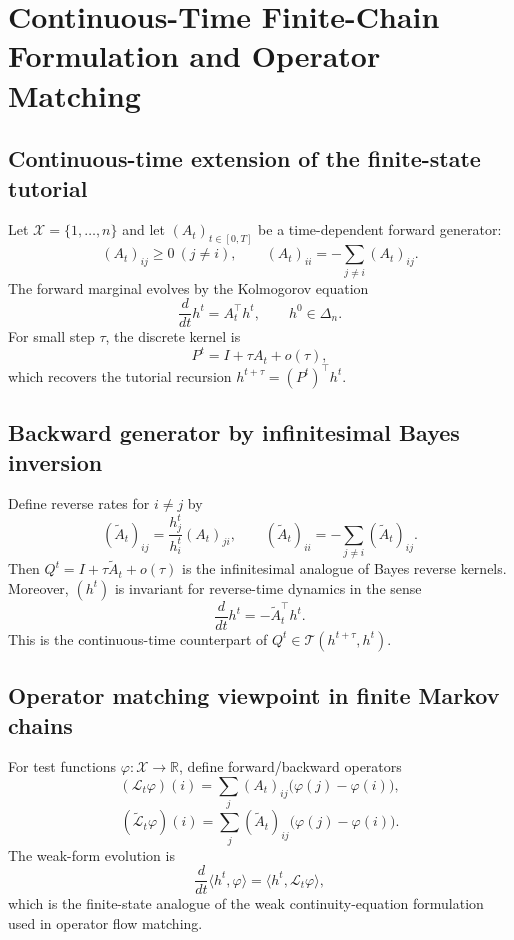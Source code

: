 \documentclass[11pt]{article}
\newcommand{\Tset}{\mathcal{T}}
\begin{document}
\section{Continuous-Time Finite-Chain Formulation and Operator Matching}
\subsection{Continuous-time extension of the finite-state tutorial}
Let $\mathcal X=\{1,\dots,n\}$ and let $(A_t)_{t\in[0,T]}$ be a time-dependent forward generator:
\[
(A_t)_{ij}\ge 0\ (j\neq i),\qquad
(A_t)_{ii}=-\sum_{j\neq i}(A_t)_{ij}.
\]
The forward marginal evolves by the Kolmogorov equation
\[
\frac{d}{dt}h^t=A_t^\top h^t,\qquad h^0\in\Delta_n.
\]
For small step $\tau$, the discrete kernel is
\[
P^t=I+\tau A_t+o(\tau),
\]
which recovers the tutorial recursion $h^{t+\tau}=(P^t)^\top h^t$.

\subsection{Backward generator by infinitesimal Bayes inversion}
Define reverse rates for $i\neq j$ by
\[
(\widetilde A_t)_{ij}
=\frac{h_j^t}{h_i^t}(A_t)_{ji},
\qquad
(\widetilde A_t)_{ii}=-\sum_{j\neq i}(\widetilde A_t)_{ij}.
\]
Then $Q^t=I+\tau \widetilde A_t+o(\tau)$ is the infinitesimal analogue of Bayes reverse kernels.
Moreover, $(h^t)$ is invariant for reverse-time dynamics in the sense
\[
\frac{d}{dt}h^t=-\widetilde A_t^\top h^t.
\]
This is the continuous-time counterpart of $Q^t\in\Tset(h^{t+\tau},h^t)$.

\subsection{Operator matching viewpoint in finite Markov chains}
For test functions $\varphi:\mathcal X\to\mathbb R$, define forward/backward operators
\[
(\mathcal L_t\varphi)(i)=\sum_j (A_t)_{ij}\big(\varphi(j)-\varphi(i)\big),
\]
\[
(\widetilde{\mathcal L}_t\varphi)(i)=\sum_j (\widetilde A_t)_{ij}\big(\varphi(j)-\varphi(i)\big).
\]
The weak-form evolution is
\[
\frac{d}{dt}\langle h^t,\varphi\rangle=\langle h^t,\mathcal L_t\varphi\rangle,
\]
which is the finite-state analogue of the weak continuity-equation formulation used in operator flow matching.
\end{document}

